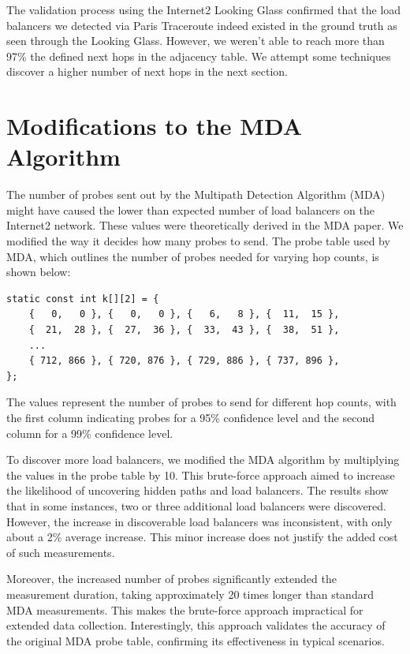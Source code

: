 \documentclass[12pt]{cwru_thesis}
\begin{document}
The validation process using the Internet2 Looking Glass confirmed that the load balancers we detected via Paris Traceroute indeed existed in the ground truth as seen through the Looking Glass. However, we weren't able to reach more than 97\% the defined next hops in the adjacency table. We attempt some techniques discover a higher number of next hops in the next section. 


\section{Modifications to the MDA Algorithm}

The number of probes sent out by the Multipath Detection Algorithm (MDA) might have caused the lower than expected number of load balancers on the Internet2 network. These values were theoretically derived in the MDA paper. We modified the way it decides how many probes to send. The probe table used by MDA, which outlines the number of probes needed for varying hop counts, is shown below:

\begin{verbatim}
static const int k[][2] = {
    {   0,   0 }, {   0,   0 }, {   6,   8 }, {  11,  15 },
    {  21,  28 }, {  27,  36 }, {  33,  43 }, {  38,  51 }, 
    ...
    { 712, 866 }, { 720, 876 }, { 729, 886 }, { 737, 896 }, 
};
\end{verbatim}

The values represent the number of probes to send for different hop counts, with the first column indicating probes for a 95\% confidence level and the second column for a 99\% confidence level.

To discover more load balancers, we modified the MDA algorithm by multiplying the values in the probe table by 10. This brute-force approach aimed to increase the likelihood of uncovering hidden paths and load balancers. The results show that in some instances, two or three additional load balancers were discovered. However, the increase in discoverable load balancers was inconsistent, with only about a 2\% average increase. This minor increase does not justify the added cost of such measurements.

Moreover, the increased number of probes significantly extended the measurement duration, taking approximately 20 times longer than standard MDA measurements. This makes the brute-force approach impractical for extended data collection. Interestingly, this approach validates the accuracy of the original MDA probe table, confirming its effectiveness in typical scenarios.
\end{document}
